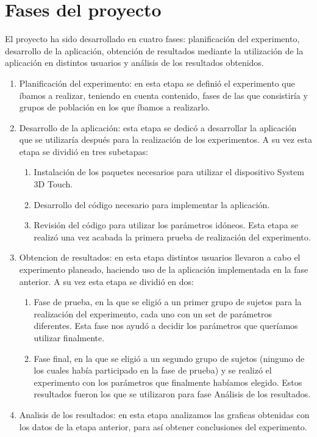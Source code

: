 \documentclass[a4paper,11pt, oneside]{book}
\begin{document}
\section{Fases del proyecto}
El proyecto ha sido desarrollado en cuatro fases: planificación del experimento, desarrollo de la aplicación, obtención de resultados mediante la utilización de la aplicación en distintos usuarios y análisis de los resultados obtenidos. 
\begin{enumerate}
	\item Planificación del experimento: en esta etapa se definió el experimento que íbamos a realizar, teniendo en cuenta contenido, fases de las que consistiría y grupos de población en los que íbamos a realizarlo.
	\item Desarrollo de la aplicación: esta etapa se dedicó a desarrollar la aplicación que se utilizaría después para la realización de los experimentos. A su vez esta etapa se dividió en tres subetapas:
	\begin{enumerate}
		\item Instalación de los paquetes necesarios para utilizar el dispositivo System 3D Touch.
		\item Desarrollo del código necesario para implementar la aplicación.
		\item Revisión del código para utilizar los parámetros idóneos. Esta etapa se realizó una vez acabada la primera prueba de realización del experimento.
	\end{enumerate}
	\item Obtencion de resultados: en esta etapa distintos usuarios llevaron a cabo el experimento planeado, haciendo uso de la aplicación implementada en la fase anterior.
	A su vez esta etapa se dividió en dos:
	\begin{enumerate}
		\item Fase de prueba, en la que se eligió a un primer grupo de sujetos para la realización del experimento, cada uno con un set de parámetros diferentes. Esta fase nos ayudó a decidir los parámetros que queríamos utilizar finalmente.
		\item Fase final, en la que se eligió a un segundo grupo de sujetos (ninguno de los cuales había participado en la fase de prueba) y se realizó el experimento con los parámetros que finalmente habíamos elegido.
		Estos resultados fueron los que se utilizaron para fase Análisis de los resultados.
	\end{enumerate}
		
	\item Analisis de los resultados: en esta etapa analizamos las graficas obtenidas con los datos de la etapa anterior, para así obtener conclusiones del experimento.
\end{enumerate}
\end{document}
